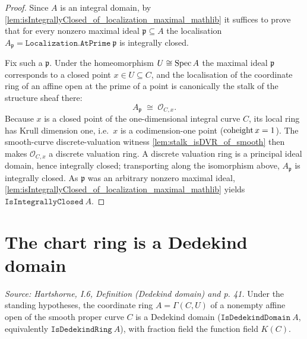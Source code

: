 \begin{proof}
        \leanok
  Since \(A\) is an integral domain, by
  \cref{lem:isIntegrallyClosed_of_localization_maximal_mathlib} it suffices to
  prove that for every nonzero maximal ideal \(\mathfrak p \subseteq A\) the
  localisation \(A_{\mathfrak p} = \texttt{Localization.AtPrime}\ \mathfrak p\)
  is integrally closed.

  Fix such a \(\mathfrak p\). Under the homeomorphism \(U \cong \operatorname{Spec} A\) the
  maximal ideal \(\mathfrak p\) corresponds to a closed point
  \(x \in U \subseteq C\), and the localisation of the coordinate ring of an
  affine open at the prime of a point is canonically the stalk of the structure
  sheaf there:
  \[
    A_{\mathfrak p} \;\cong\; \mathcal O_{C, x}.
  \]
  Because \(x\) is a closed point of the one-dimensional integral curve \(C\),
  its local ring has Krull dimension one, i.e.\ \(x\) is a codimension-one
  point (\(\operatorname{coheight} x = 1\)). The smooth-curve discrete-valuation witness
  \cref{lem:stalk_isDVR_of_smooth} then makes \(\mathcal O_{C, x}\) a discrete
  valuation ring. A discrete valuation ring is a principal ideal domain, hence
  integrally closed; transporting along the isomorphism above,
  \(A_{\mathfrak p}\) is integrally closed. As \(\mathfrak p\) was an arbitrary
  nonzero maximal ideal, \cref{lem:isIntegrallyClosed_of_localization_maximal_mathlib}
  yields \(\texttt{IsIntegrallyClosed}\ A\).
\end{proof}

\section{The chart ring is a Dedekind domain}

\begin{theorem}
  \label{thm:chart_isDedekindDomain}
  \textit{Source: Hartshorne, I.6, Definition (Dedekind domain) and p. 41.}
  Under the standing hypotheses, the coordinate ring \(A = \Gamma(C, U)\) of a
  nonempty affine open of the smooth proper curve \(C\) is a Dedekind domain
  (\(\texttt{IsDedekindDomain}\ A\), equivalently \(\texttt{IsDedekindRing}\ A\)),
  with fraction field the function field \(K(C)\).
\end{theorem}

